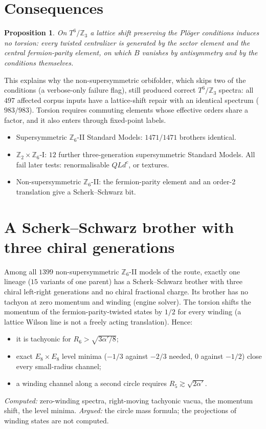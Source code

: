 \documentclass[11pt]{article}
\newtheorem{proposition}{Proposition}
\begin{document}
\section{Consequences}
\begin{proposition}
On $T^6/\mathbb Z_3$ a lattice shift preserving the Pl\"oger conditions induces no torsion: every twisted centralizer is generated by
the sector element and the central fermion-parity element, on which $B$ vanishes by antisymmetry and by the conditions themselves.
\end{proposition}
This explains why the non-supersymmetric orbifolder, which skips two of the conditions (a verbose-only failure flag), still produced
correct $T^6/\mathbb Z_3$ spectra: all $497$ affected corpus inputs have a lattice-shift repair with an identical spectrum ($983/983$).
Torsion requires commuting elements whose effective orders share a factor, and it also enters through fixed-point labels.
\begin{itemize}
\item Supersymmetric $\mathbb Z_6$-II Standard Models: $1471/1471$ brothers identical.
\item $\mathbb Z_2\times\mathbb Z_6$-I: $12$ further three-generation supersymmetric Standard Models. All fail later tests: renormalisable
$QLd^c$, or textures.
\item Non-supersymmetric $\mathbb Z_6$-II: the fermion-parity element and an order-2 translation give a Scherk--Schwarz bit.
\end{itemize}

\section{A Scherk--Schwarz brother with three chiral generations}
Among all $1399$ non-supersymmetric $\mathbb Z_6$-II models of the route, exactly one lineage ($15$ variants of one parent) has a
Scherk--Schwarz brother with three chiral left-right generations and no chiral fractional charge. Its brother has no tachyon at zero
momentum and winding (engine solver). The torsion shifts the momentum of the fermion-parity-twisted states by $1/2$ for every winding (a
lattice Wilson line is not a freely acting translation). Hence:
\begin{itemize}
\item it is tachyonic for $R_6>\sqrt{3\alpha'/8}$;
\item exact $E_8\times E_8$ level minima ($-1/3$ against $-2/3$ needed, $0$ against $-1/2$) close every small-radius channel;
\item a winding channel along a second circle requires $R_5\gtrsim\sqrt{2\alpha'}$.
\end{itemize}
\emph{Computed:} zero-winding spectra, right-moving tachyonic vacua, the momentum shift, the level minima. \emph{Argued:} the circle mass
formula; the projections of winding states are not computed.
\end{document}
